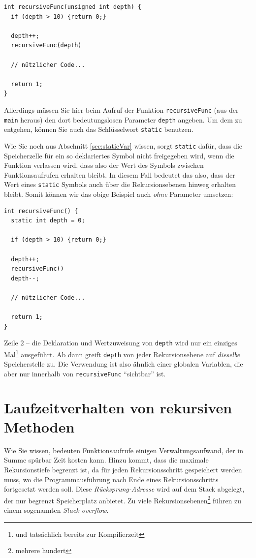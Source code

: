 \begin{codebox}
\begin{verbatim}
int recursiveFunc(unsigned int depth) {
  if (depth > 10) {return 0;}
  
  depth++;
  recursiveFunc(depth)
  
  // nützlicher Code...
  
  return 1;
}
\end{verbatim}
\end{codebox}

Allerdings müssen Sie hier beim Aufruf der Funktion \texttt{recursiveFunc} (\eg aus der \texttt{main} heraus) den dort bedeutungslosen Parameter \texttt{depth} angeben. Um dem zu entgehen, können Sie auch das Schlüsselwort \texttt{static} benutzen.

Wie Sie noch aus Abschnitt \ref{sec:staticVar} wissen, sorgt \texttt{static} dafür, dass die Speicherzelle für ein so deklariertes Symbol nicht freigegeben wird, wenn die Funktion verlassen wird, dass also der Wert des Symbols zwischen Funktionsaufrufen erhalten bleibt. In diesem Fall bedeutet das also, dass der Wert eines \texttt{static} Symbols auch über die Rekursionsebenen hinweg erhalten bleibt. Somit können wir das obige Beispiel auch \emph{ohne} Parameter umsetzen:

\begin{codebox}
\begin{verbatim}
int recursiveFunc() {
  static int depth = 0;
  
  if (depth > 10) {return 0;}
  
  depth++;
  recursiveFunc()
  depth--;
  
  // nützlicher Code...
  
  return 1;
}
\end{verbatim}
\end{codebox}

Zeile 2 -- die Deklaration und Wertzuweisung von \texttt{depth} wird nur ein einziges Mal\footnote{und tatsächlich bereits zur Kompilierzeit} ausgeführt. Ab dann greift \texttt{depth} von jeder Rekursionsebene auf \emph{dieselbe} Speicherstelle zu. Die Verwendung ist also ähnlich einer globalen Variablen, die aber nur innerhalb von \texttt{recursiveFunc} \enquote{sichtbar} ist.

\section{Laufzeitverhalten von rekursiven Methoden}
Wie Sie wissen, bedeuten Funktionsaufrufe einigen Verwaltungsaufwand, der in Summe spürbar Zeit kosten kann. Hinzu kommt, dass die maximale Rekursionstiefe begrenzt ist, da für jeden Rekursionsschritt gespeichert werden muss, wo die Programmausführung nach Ende eines Rekursionsschritts fortgesetzt werden soll. Diese \emph{Rücksprung-Adresse} wird auf dem Stack abgelegt, der nur begrenzt Speicherplatz anbietet. Zu viele Rekursionsebenen\footnote{mehrere hundert} führen zu einem sogenannten \emph{Stack overflow}.

